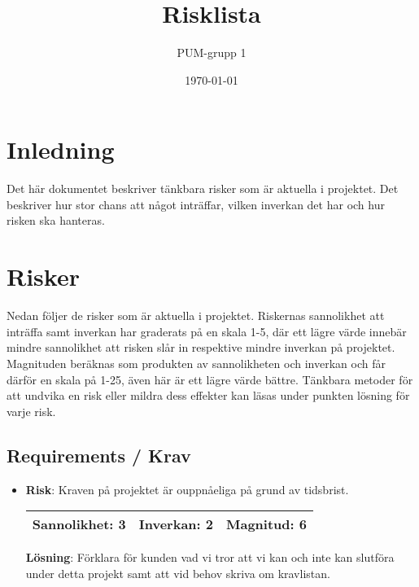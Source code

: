 

\ifpdf
\else
\fi

\title{Risklista}
\author{PUM-grupp 1}
\date{\today}



\maketitle\thispagestyle{empty}

\newpage

\setcounter{tocdepth}{2}
\newpage

\section{Inledning}
Det här dokumentet beskriver tänkbara risker som är aktuella i projektet. Det beskriver hur stor chans att något inträffar, vilken inverkan det har och hur risken ska hanteras.

\section{Risker}
Nedan följer de risker som är aktuella i projektet. Riskernas sannolikhet att inträffa samt inverkan har graderats på en skala 1-5, där ett lägre värde innebär mindre sannolikhet att risken slår in respektive mindre inverkan på projektet. Magnituden beräknas som produkten av sannolikheten och inverkan och får därför en skala på 1-25, även här är ett lägre värde bättre. Tänkbara metoder för att undvika en risk eller mildra dess effekter kan läsas under punkten lösning för varje risk.

\subsection{Requirements / Krav}
\begin{itemize}
\item \textbf{Risk}: Kraven på projektet är ouppnåeliga på grund av tidsbrist.

\begin{tabular}{ | l | l | l |}
	\hline
	Sannolikhet: 3 & Inverkan: 2 & Magnitud: 6 \\ \hline
\end{tabular}

\textbf{Lösning}: Förklara för kunden vad vi tror att vi kan och inte kan slutföra under detta projekt samt att vid behov skriva om kravlistan.
\end{itemize}

